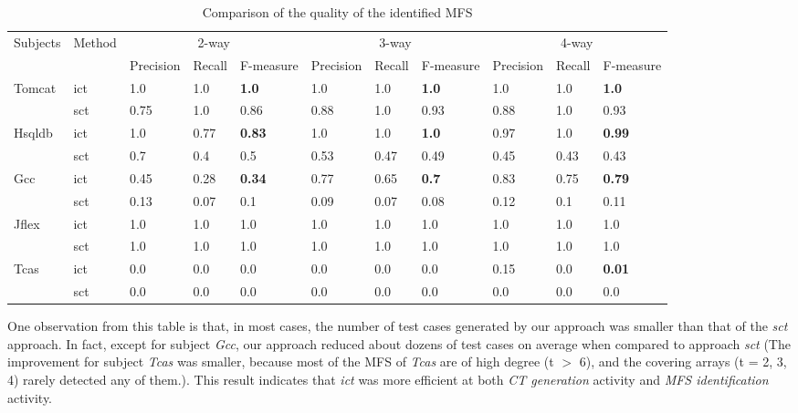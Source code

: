\documentclass[journal,12pt,onecolumn,draftclsnofoot,]{IEEEtran}
\begin{document}
\begin{table}[ht]
\centering
\caption{Comparison of the quality of the identified MFS}
\label{cm_elda_fglt}
\begin{tabular}{|ll|lll|lll|lll|}
\hline
\multirow{2}{*}{Subjects} & \multirow{2}{*}{Method} & \multicolumn{3}{c|}{2-way} & \multicolumn{3}{c|}{3-way} & \multicolumn{3}{c|}{4-way} \\ \cline{3-11}
                         &                        & Precision & Recall & F-measure   & Precision & Recall & F-measure & Precision & Recall & F-measure   \\ \hline
Tomcat	&ict	&1.0	&1.0	&\textbf{1.0}	&1.0	&1.0	&\textbf{1.0}	&1.0	&1.0	&\textbf{1.0}	\\
	&sct	&0.75	&1.0	&0.86	&0.88	&1.0	&0.93	&0.88	&1.0	&0.93	\\\hline
Hsqldb	&ict	&1.0	&0.77	&\textbf{0.83}	&1.0	&1.0	&\textbf{1.0}	&0.97	&1.0	&\textbf{0.99}	\\
	&sct	&0.7	&0.4	&0.5	&0.53	&0.47	&0.49	&0.45	&0.43	&0.43	\\\hline
Gcc	&ict	&0.45	&0.28	&\textbf{0.34}	&0.77	&0.65	&\textbf{0.7}	&0.83	&0.75	&\textbf{0.79}	\\
	&sct	&0.13	&0.07	&0.1	&0.09	&0.07	&0.08	&0.12	&0.1	&0.11	\\\hline
Jflex	&ict	&1.0	&1.0	&1.0	&1.0	&1.0	&1.0	&1.0	&1.0	&1.0	\\
	&sct	&1.0	&1.0	&1.0	&1.0	&1.0	&1.0	&1.0	&1.0	&1.0	\\\hline
Tcas	&ict	&0.0	&0.0	&0.0	&0.0	&0.0	&0.0	&0.15	&0.0	&\textbf{0.01}	\\
	&sct	&0.0	&0.0	&0.0	&0.0	&0.0	&0.0	&0.0	&0.0	&0.0	\\\hline
\end{tabular}
\end{table}


One observation from this table is that, in most cases, the number of test cases generated by our approach was smaller than that of the \emph{sct} approach. In fact, except for subject \emph{Gcc}, our approach reduced about dozens of test cases on average when compared to approach \emph{sct}  (The improvement for subject \emph{Tcas} was smaller, because most of the MFS of \emph{Tcas} are of high degree (t $>$ 6), and the covering arrays (t = 2, 3, 4) rarely detected any of them.). This result indicates that \emph{ict} was more efficient at both \emph{CT generation} activity and \emph{MFS identification} activity.
\end{document}
